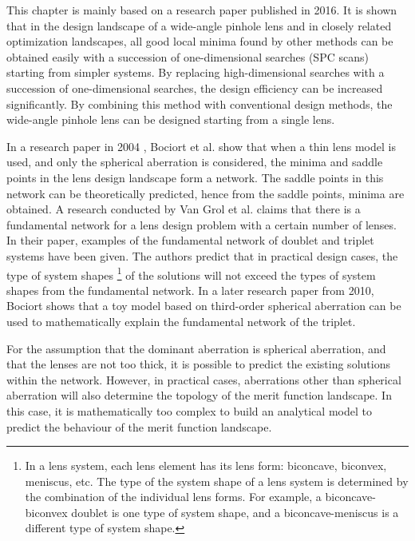 This chapter is mainly based on a research paper\cite{HouSimple16} published in 2016. It is shown that in the design landscape of a wide-angle pinhole lens and in closely related optimization landscapes, all good local minima found by other methods can be obtained easily with a succession of one-dimensional searches (SPC scans) starting from simpler systems. By replacing high-dimensional searches with a succession of one-dimensional searches, the design efficiency can be increased significantly. By combining this method with conventional design methods, the wide-angle pinhole lens can be designed starting from a single lens.

In a research paper in 2004 \cite{BociortThinLens2004}, Bociort et al. show that when a thin lens model is used, and only the spherical aberration is considered, the minima and saddle points in the lens design landscape form a network. The saddle points in this network can be theoretically predicted, hence from the saddle points, minima are obtained. A research conducted by Van Grol et al.\cite{PascalTriplet2009} claims that there is a fundamental network for a lens design problem with a certain number of lenses. In their paper, examples of the fundamental network of doublet and triplet systems have been given. The authors predict that in practical design cases, the type of system shapes \footnote{In a lens system, each lens element has its lens form: biconcave, biconvex, meniscus, etc. The type of the system shape of a lens system is determined by the combination of the individual lens forms. For example, a biconcave-biconvex doublet is one type of system shape, and a biconcave-meniscus is a different type of system shape. } of the solutions will not exceed the types of system shapes from the fundamental network. In a later research paper from 2010\cite{BociortTripletExplained2010}\cite{BociortToyModel2010}, Bociort shows that a toy model based on third-order spherical aberration can be used to mathematically explain the fundamental network of the triplet. 

For the assumption that the dominant aberration is spherical aberration, and that the lenses are not too thick, it is possible to predict the existing solutions within the network. However, in practical cases, aberrations other than spherical aberration will also determine the topology of the merit function landscape. In this case, it is mathematically too complex to build an analytical model to predict the behaviour of the merit function landscape.

